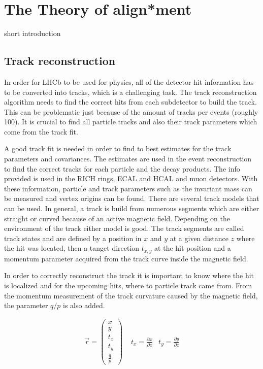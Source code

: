\chapter{The Theory of align*ment}
\label{sec:align*Theory}

short introduction

\section{Track reconstruction}
\label{sec:kalman}

In order for LHCb to be used for physics, all of the detector hit information has to be converted into tracks, which is a challenging task.
The track reconstruction algorithm needs to find the correct hits from each subdetector to build the track. This can be problematic just because of the amount of tracks per events (roughly 100).
It is crucial to find all particle tracks and also their track parameters which come from the track fit.

A good track fit is needed in order to find to best estimates for the track parameters and covariances. The estimates are used in the event reconstruction to find the correct tracks for each particle and the decay products. The info provided is used in the RICH rings, ECAL and HCAL and muon detectors. With these information, particle and track parameters such as the invariant mass can be measured and vertex origins can be found.
There are several track models that can be used. In general, a track is build from numerous segments which are either straight or curved because of an active magnetic field. Depending on the environment of the track either model is good.
The track segments are called track states and are defined by a position in $x$ and $y$ at a given distance $z$ where the hit was located, then a tanget direction $t_{x,y}$ at the hit position and a momentum parameter acquired from the track curve inside the magnetic field\cite{VanTilburg}.

In order to correctly reconstruct the track it is important to know where the hit is localized and for the upcoming hits, where to particle track came from. From the momentum measurement of the track curvature caused by the magnetic field, the parameter $q/p$ is also added.

\begin{align*}
  \vec{r} = \left(\begin{array}{c} x \\ y \\ t_x \\ t_y \\ \frac{q}{p}\end{array}\right) &\,\, t_x = \frac{\partial x}{\partial z} & t_y = \frac{\partial y}{\partial z}
\end{align*}

